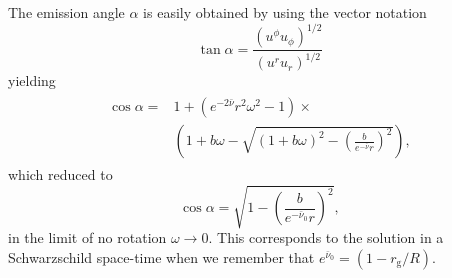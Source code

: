 \documentclass[iop, usenatbib]{emulateapj}
\newcommand{\be}{\begin{equation}}
\newcommand{\ee}{\end{equation}}
\newcommand{\rg}{\ensuremath{r_{\mathrm{g}}}}
\newcommand{\sch}{Schwarzschild }
\newcommand{\nub}{\ensuremath{\bar{\nu}}}
\begin{document}
The emission angle $\alpha$ is easily obtained by using the vector notation
\be
\tan \alpha = \frac{(u^{\phi}u_{\phi})^{1/2}}{(u^ru_r)^{1/2}}
\ee
yielding
\begin{align}\begin{split}
\cos \alpha = & 1 + (e^{-2\nub}r^2\omega^2 -1) \times \\
            & \left( 1+b\omega - \sqrt{(1+b\omega)^2 - \left(\frac{b}{e^{-\nub}r}\right)^2} \right),
\end{split}\end{align}
which reduced to 
\be
\cos \alpha = \sqrt{1-\left( \frac{b}{e^{-\nub_0}r} \right)^2},
\ee
in the limit of no rotation $\omega \rightarrow 0$. This corresponds to the solution in a \sch space-time when we remember that $e^{\nub_0} = (1-\rg/R)$.
\end{document}
